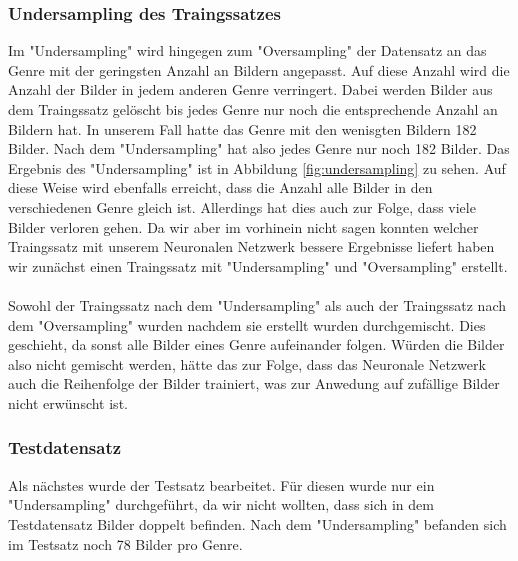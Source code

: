 \subsubsection{Undersampling des Traingssatzes}
Im "Undersampling" wird hingegen zum "Oversampling" der Datensatz an das Genre mit der geringsten Anzahl an Bildern angepasst.
Auf diese Anzahl wird die Anzahl der Bilder in jedem anderen Genre verringert.
Dabei werden Bilder aus dem Traingssatz gelöscht bis jedes Genre nur noch die entsprechende Anzahl an Bildern hat.
In unserem Fall hatte das Genre mit den wenisgten Bildern 182 Bilder.
Nach dem "Undersampling" hat also jedes Genre nur noch 182 Bilder.
Das Ergebnis des "Undersampling" ist in Abbildung \ref{fig:undersampling} zu sehen.
Auf diese Weise wird ebenfalls erreicht, dass die Anzahl alle Bilder in den verschiedenen Genre gleich ist.
Allerdings hat dies auch zur Folge, dass viele Bilder verloren gehen.
Da wir aber im vorhinein nicht sagen konnten welcher Traingssatz mit unserem Neuronalen Netzwerk bessere Ergebnisse liefert haben wir zunächst einen Traingssatz mit "Undersampling" und "Oversampling" erstellt.
\\\\
Sowohl der Traingssatz nach dem "Undersampling" als auch der Traingssatz nach dem "Oversampling" wurden nachdem sie erstellt wurden durchgemischt.
Dies geschieht, da sonst alle Bilder eines Genre aufeinander folgen.
Würden die Bilder also nicht gemischt werden, hätte das zur Folge, dass das Neuronale Netzwerk auch die Reihenfolge der Bilder trainiert, was zur Anwedung auf zufällige Bilder nicht erwünscht ist.

\subsubsection{Testdatensatz}
Als nächstes wurde der Testsatz bearbeitet.
Für diesen wurde nur ein "Undersampling" durchgeführt, da wir nicht wollten, dass sich in dem Testdatensatz Bilder doppelt befinden.
Nach dem "Undersampling" befanden sich im Testsatz noch 78 Bilder pro Genre.

